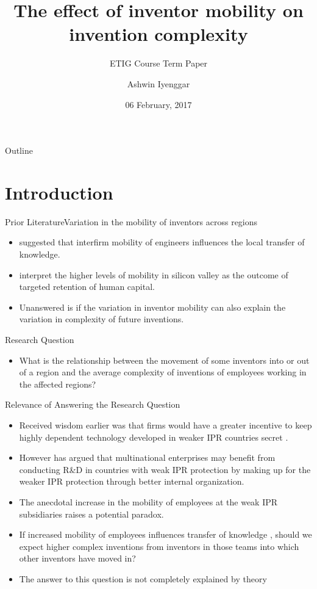 \documentclass{beamer}
\title{The effect of inventor mobility on  invention complexity}
\subtitle{ETIG Course Term Paper}
\author{Ashwin Iyenggar}
\institute[Indian Institute of Management Bangalore] 
{
  Corporate Strategy and Policy\\
  Indian Institute of Management Bangalore
}
\date{06 February, 2017}
\begin{document}
\begin{frame}
  \titlepage
\end{frame}

\begin{frame}{Outline}
  \tableofcontents
\end{frame}

\section{Introduction}
\begin{frame}{Prior Literature}{Variation in the mobility of inventors across regions}
\begin{itemize}
\item{\cite{Almeida1999} suggested that interfirm mobility of engineers influences the local transfer of knowledge.}
\item{\cite{Ge2016} interpret the higher levels of mobility in silicon valley as the outcome of targeted retention of human capital.}
\item{Unanswered is if the variation in inventor mobility can also explain the variation in complexity of future inventions.}
\end{itemize}
\end{frame}

\begin{frame}{Research Question}{}
\begin{itemize}
\item{What is the relationship between the movement of some inventors into or out of a region and the average complexity of inventions of employees working in the affected regions?}
\end{itemize}
\end{frame}

\begin{frame}{Relevance of Answering the Research Question}{}
\begin{itemize}
\item{Received wisdom earlier was that firms would have a greater incentive to keep  highly dependent technology developed in weaker IPR countries secret \citep{Cohen2000}.}
\item{However  \cite{Zhao2006} has argued  that multinational enterprises may benefit from conducting R\&D in countries with weak IPR protection by  making up for the weaker IPR protection through better internal organization.}
\item{The anecdotal increase in the mobility of employees at the weak IPR subsidiaries raises a potential paradox.}
\item{If increased mobility of employees influences transfer of knowledge \citep{Almeida1999}, should we expect higher complex inventions from inventors in those teams into which other inventors have moved in?}
\item{The answer to this question is not completely explained by theory}
\end{itemize}
\end{frame}
\end{document}
